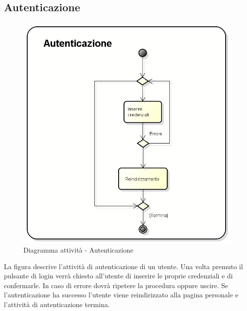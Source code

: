 \subsection{Autenticazione}
\begin{figure}[h] 
	\centering 
	\includegraphics[width=0.9\linewidth] {img/activity_login.png}
	\caption{Diagramma attività - Autenticazione} 
\end{figure}
La figura descrive l'attività di autenticazione di un utente. Una volta premuto il pulsante di login verrà chiesto all'utente di inserire le proprie credenziali e di confermarle. In caso di errore dovrà ripetere la procedura oppure uscire. Se l'autenticazione ha successo l'utente viene reindirizzato alla pagina personale e l'attività di autenticazione termina.
\newpage


